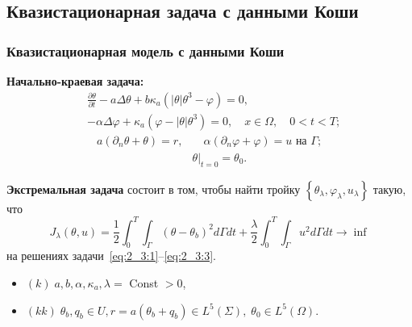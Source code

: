\subsection{Квазистационарная задача с данными Коши}\label{subsec:qst_koshi}
\begin{frame}
    \frametitle{Квазистационарная модель с данными Коши}
    \textbf{Начально-краевая задача:}
    \begin{equation}
        \label{eq:2_3:1}
        \begin{split}
            & \frac{\partial \theta}{\partial t} - a \Delta \theta
            + b \kappa_{a} \left(|\theta| \theta^{3}-\varphi\right) = 0,\\
            & - \alpha \Delta \varphi
            + \kappa_{a} \left(\varphi-|\theta| \theta^{3}\right) = 0,
            \quad x \in \Omega, \quad 0 < t < T;
        \end{split}
    \end{equation}
    \begin{align}
        a \left(\partial_{n} \theta+\theta\right)=r,
        & \quad \alpha\left(\partial_{n} \varphi
        + \varphi\right) = u \text { на } \Gamma;  \label{eq:2_3:2}\\
        & \left.\theta\right|_{t=0} = \theta_{0}. \label{eq:2_3:3}
    \end{align}


    \textbf{Экстремальная задача} состоит в том, чтобы найти тройку
    $\left\{\theta_{\lambda}, \varphi_{\lambda}, u_{\lambda}\right\}$ такую, что
    \begin{equation}
        \label{eq:2_3:4}
        J_{\lambda}(\theta, u)=\frac{1}{2} \int_{0}^{T}
        \int_{\Gamma}\left(\theta-\theta_{b}\right)^{2} d \Gamma d t+\frac{\lambda}{2}
        \int_{0}^{T} \int_{\Gamma} u^{2} d \Gamma d t \rightarrow \inf
    \end{equation}
    на решениях задачи~\eqref{eq:2_3:1}--\eqref{eq:2_3:3}.
    \begin{itemize}
        \item $(k)\; a, b, \alpha, \kappa_{a}, \lambda=$ Const $>0$,
        \item $(kk)\; \theta_{b}, q_{b} \in U, r=a\left(\theta_{b}+q_{b}\right)
        \in L^{5}(\Sigma), \; \theta_{0} \in L^{5}(\Omega)$.
    \end{itemize}



\end{frame}

